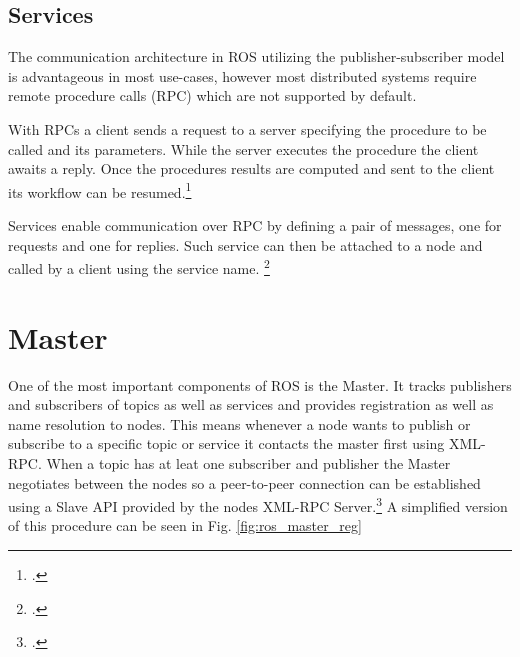 \subsection{Services}
The communication architecture in ROS utilizing the publisher-subscriber model is advantageous in most use-cases, however most distributed systems require remote procedure calls (RPC) which are not supported by default.

With RPCs a client sends a request to a server specifying the procedure to be called and its parameters. While the server executes the procedure the client awaits a reply. Once the procedures results are computed and sent to the client its workflow can be resumed.\footcite[Page 3]{rfc1831}

Services enable communication over RPC by defining a pair of messages, one for requests and one for replies. Such service can then be attached to a node and called by a client using the service name. \footcite{openSourceRoboticsFoundationServicesNodate}




\section{Master}
One of the most important components of ROS is the Master. It tracks publishers and subscribers of topics as well as services and provides registration as well as name resolution to nodes. This means whenever a node wants to publish or subscribe to a specific topic or service it contacts the master first using XML-RPC. When a topic has at leat one subscriber and publisher the Master negotiates between the nodes so a peer-to-peer connection can be established using a Slave API provided by the nodes XML-RPC Server.\footcite{openSourceRoboticsFoundationMasterNodate} A simplified version of this procedure can be seen in Fig. \ref{fig:ros_master_reg}

